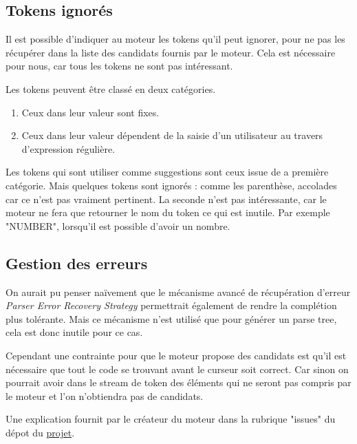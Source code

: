 \documentclass[
    iict, %
    il, %
]{heig-tb}
\begin{document}
\subsection{Tokens ignorés}

Il est possible d'indiquer au moteur les tokens qu'il peut ignorer, pour ne pas les récupérer dans la liste des candidats fournis par le moteur.
Cela est nécessaire pour nous, car tous les tokens ne sont pas intéressant.

Les tokens peuvent être classé en deux catégories.

\begin{enumerate}
    \item Ceux dans leur valeur sont fixes.
    \item Ceux dans leur valeur dépendent de la saisie d'un utilisateur au travers d'expression régulière.
\end{enumerate}

Les tokens qui sont utiliser comme suggestions sont ceux issue de a première catégorie. Mais quelques tokens sont ignorés : comme les parenthèse, accolades car ce n'est pas vraiment pertinent. %
La seconde n'est pas intéressante, car le moteur ne fera que retourner le nom du token ce qui est inutile. Par exemple "NUMBER", lorsqu'il est possible d'avoir un nombre.

\subsection{Gestion des erreurs }\label{error handle}

On aurait pu penser naïvement que le mécanisme avancé de récupération d'erreur \emph{Parser Error Recovery Strategy} permettrait également de rendre la complétion plus tolérante.
Mais ce mécanisme n'est utilisé que pour générer un parse tree, cela est donc inutile pour ce cas.

Cependant une contrainte pour que le moteur propose des candidats est qu'il est nécessaire que tout le code se trouvant avant le curseur soit correct.
Car sinon on pourrait avoir dans le stream de token des éléments qui ne seront pas compris par le moteur et l'on n'obtiendra pas de candidats.

Une explication fournit par le créateur du moteur dans la rubrique "issues" du dépot du \href{ https://github.com/mike-lischke/antlr4-c3/issues/29}{projet}.
\end{document}
